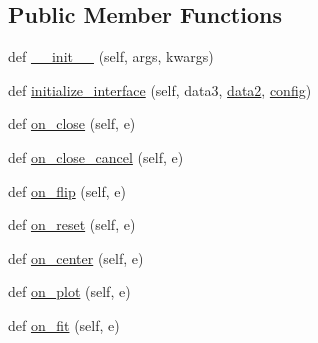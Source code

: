 \subsection*{Public Member Functions}
\begin{DoxyCompactItemize}
\item 
def \hyperlink{class_uni_dec_1_1unidec__modules_1_1peakwidthtools_1_1_peak_tools2d_a67578eb9a439f5edaffdaab5e301018c}{\+\_\+\+\_\+init\+\_\+\+\_\+} (self, args, kwargs)
\item 
def \hyperlink{class_uni_dec_1_1unidec__modules_1_1peakwidthtools_1_1_peak_tools2d_a8054bfcf237653422c51eb694d85853f}{initialize\+\_\+interface} (self, data3, \hyperlink{class_uni_dec_1_1unidec__modules_1_1peakwidthtools_1_1_peak_tools2d_a5bbcc81e33cea4a1272cdc0dfa633087}{data2}, \hyperlink{class_uni_dec_1_1unidec__modules_1_1peakwidthtools_1_1_peak_tools2d_a8a1b2cc690f0c7040621f13f262afb45}{config})
\item 
def \hyperlink{class_uni_dec_1_1unidec__modules_1_1peakwidthtools_1_1_peak_tools2d_a95c586611db7fa19815344e6a402e8b0}{on\+\_\+close} (self, e)
\item 
def \hyperlink{class_uni_dec_1_1unidec__modules_1_1peakwidthtools_1_1_peak_tools2d_a557ce802fc814b909e90775f3b769b39}{on\+\_\+close\+\_\+cancel} (self, e)
\item 
def \hyperlink{class_uni_dec_1_1unidec__modules_1_1peakwidthtools_1_1_peak_tools2d_ae9044104817f6bfeb11d7c364152b496}{on\+\_\+flip} (self, e)
\item 
def \hyperlink{class_uni_dec_1_1unidec__modules_1_1peakwidthtools_1_1_peak_tools2d_a2679ce6230c67b50f7e726889d9537c1}{on\+\_\+reset} (self, e)
\item 
def \hyperlink{class_uni_dec_1_1unidec__modules_1_1peakwidthtools_1_1_peak_tools2d_a315370d21c0b8ee85665b8433530b986}{on\+\_\+center} (self, e)
\item 
def \hyperlink{class_uni_dec_1_1unidec__modules_1_1peakwidthtools_1_1_peak_tools2d_ae38a6e18bd8ec0c0bf0f6ad3747e5f6b}{on\+\_\+plot} (self, e)
\item 
def \hyperlink{class_uni_dec_1_1unidec__modules_1_1peakwidthtools_1_1_peak_tools2d_a0a9e1a99cb7c056e6f917af85c4d2fa1}{on\+\_\+fit} (self, e)
\end{DoxyCompactItemize}

